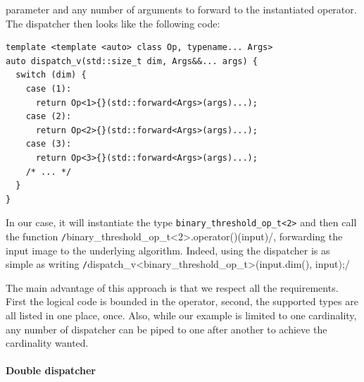 parameter and any number of arguments to forward to the instantiated operator. The dispatcher then looks like the
following code:
\begin{verbatim}
template <template <auto> class Op, typename... Args>
auto dispatch_v(std::size_t dim, Args&&... args) {
  switch (dim) {
    case (1):
      return Op<1>{}(std::forward<Args>(args)...);
    case (2):
      return Op<2>{}(std::forward<Args>(args)...);
    case (3):
      return Op<3>{}(std::forward<Args>(args)...);
    /* ... */
  }
}
\end{verbatim}
 In our case, it will instantiate the type
\texttt{binary\_threshold\_op\_t<2>} and then call the function
\texttt/binary_threshold_op_t<2>.operator()(input)/, forwarding the input image to the underlying algorithm.
Indeed, using the dispatcher is as simple as writing \texttt/dispatch_v<binary_threshold_op_t>(input.dim(),
input);/

The main advantage of this approach is that we respect all the requirements. First the logical code is bounded in the
operator, second, the supported types are all listed in one place, once. Also, while our example is limited to one
cardinality, any number of dispatcher can be piped to one after another to achieve the cardinality wanted.


\paragraph{Double dispatcher}

